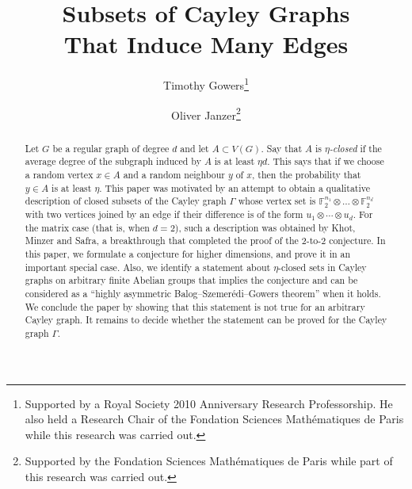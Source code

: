 \documentclass{toc}
\begin{document}
\begin{frontmatter}[classification=text]
  
%
\title{Subsets of Cayley Graphs\\ That Induce Many Edges}  %

%
%

%
%
%

%
%
%
%
%
%
%
%
%
%
%
%


%
%
%
%

%

\author[gowers]{%
	Timothy Gowers\thanks{Supported by a Royal Society 2010 Anniversary Research Professorship. He also held a Research Chair of the Fondation Sciences Math\'ematiques de Paris while this research was carried out.}}
\author[janzer]{Oliver Janzer\thanks{Supported by the Fondation Sciences Math\'ematiques de Paris while part of this research was carried out.}}

%
%
%
%

%
%
%
%
%
%
\begin{abstract}
  Let $G$ be a regular graph of degree $d$ and let $A\subset V(G)$. Say that $A$ is \emph{$\eta$-closed} if the average degree of the subgraph induced by $A$ is at least $\eta d$. This says that if we choose a random vertex $x\in A$ and a random neighbour $y$ of $x$, then the probability that $y\in A$ is at least $\eta$.
%
This  %
paper was motivated by an attempt to obtain a qualitative description of closed subsets of the Cayley graph $\Gamma$ whose vertex set is $\mathbb{F}_2^{n_1}\otimes \dots \otimes \mathbb{F}_2^{n_d}$ with two vertices joined by an edge if their difference is of the form $u_1\otimes \cdots \otimes u_d$. For the matrix case (that is, when $d=2$), such a description was obtained by Khot, Minzer and Safra, a breakthrough that completed the proof of the 2-to-2 conjecture. In this paper, we formulate a conjecture for higher dimensions, and prove it in an important special case. Also, we identify a statement about $\eta$-closed sets in Cayley graphs on arbitrary finite Abelian groups that implies the conjecture and can be considered as a ``highly asymmetric Balog--Szemer\'edi--Gowers theorem'' when it holds. We conclude the paper by showing that this statement is not true for an arbitrary Cayley graph. It remains to decide whether the statement can be proved for the Cayley graph $\Gamma$.
\end{abstract}

%

\end{frontmatter}
\end{document}
